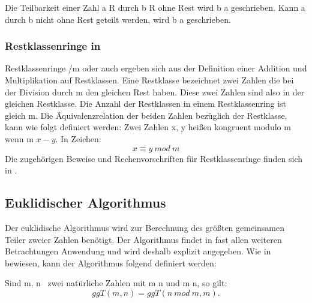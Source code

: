 			Die Teilbarkeit einer Zahl a \myin R durch b \myin R ohne Rest wird b \myTeiler a geschrieben. Kann a durch b nicht ohne Rest geteilt werden, wird b \myNichtTeiler a geschrieben.
		
		\subsubsection{Restklassenringe in }
			Restklassenringe \myMenge{Z}/m oder auch  ergeben sich aus der Definition einer Addition und Multiplikation auf Restklassen. Eine Restklasse bezeichnet zwei Zahlen \myin {} die bei der Division durch m \myin {} den gleichen Rest haben. Diese zwei Zahlen sind also in der gleichen Restklasse. Die Anzahl der Restklassen in einem Restklassenring ist gleich m. Die Äquivalenzrelation der beiden Zahlen bezüglich der Restklasse, kann wie folgt definiert werden:
			Zwei Zahlen x, y \myin {} heißen kongruent modulo m \myin {} wenn m \myTeiler $x-y$. In Zeichen:
			\begin{displaymath}
				x \equiv y~mod~m
			\end{displaymath}	
			Die zugehörigen Beweise und Rechenvorschriften für Restklassenringe finden sich in \cite{Algorithmische:Zahlentheorie}.
			
		\subsection{Euklidischer Algorithmus}
			Der euklidische Algorithmus wird zur Berechnung des größten gemeinsamen Teiler zweier Zahlen benötigt. Der Algorithmus findet in fast allen weiteren Betrachtungen Anwendung und wird deshalb explizit angegeben. Wie in \cite{Diskrete:Strukturen} bewiesen, kann der Algorithmus folgend definiert werden:
			
			Sind m, n \myin {}\ zwei natürliche Zahlen mit m \myKleinerGleich n und m \myNichtTeiler n, so gilt:
			\begin{displaymath}
				ggT(m, n) = ggT(n~mod~m, m).
			\end{displaymath}
						

